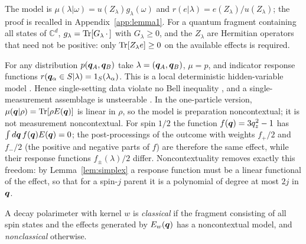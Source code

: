 The model is $\mu(\lambda|\omega)=u(Z_\lambda)g_\lambda(\omega)$ and $r(e|\lambda)=e(Z_\lambda)/u(Z_\lambda)$; the proof is recalled in Appendix~\ref{app:lemma1}. For a quantum fragment containing all states of $\mathbb{C}^d$, $g_\lambda=\operatorname{Tr}[G_\lambda\,\cdot\,]$ with $G_\lambda\ge0$, and the $Z_\lambda$ are Hermitian operators that need not be positive: only $\operatorname{Tr}[Z_\lambda e]\ge0$ on the available effects is required.

\begin{remark}
\label{rem:lhv}
For any distribution $p(\bm{q}_A,\bm{q}_B)$ take $\lambda=(\bm{q}_A,\bm{q}_B)$, $\mu=p$, and indicator response functions $r(\bm{q}_\alpha\in S|\lambda)=1_S(\lambda_\alpha)$. This is a local deterministic hidden-variable model \cite{abel1992,abel2025,fucci2026}. Hence single-setting data violate no Bell inequality \cite{brunner2014}, and a single-measurement assemblage is unsteerable \cite{wiseman2007}. In the one-particle version, $\mu(\bm{q}|\rho)=\operatorname{Tr}[\rho E(\bm{q})]$ is linear in $\rho$, so the model is preparation noncontextual; it is not measurement noncontextual. For spin $1/2$ the function $f(\bm{q})=3q_z^2-1$ has $\int d\bm{q}\,f(\bm{q})E(\bm{q})=0$; the post-processings of the outcome with weights $f_+/2$ and $f_-/2$ (the positive and negative parts of $f$) are therefore the same effect, while their response functions $f_\pm(\lambda)/2$ differ. Noncontextuality removes exactly this freedom: by Lemma~\ref{lem:simplex} a response function must be a linear functional of the effect, so that for a spin-$j$ parent it is a polynomial of degree at most $2j$ in $\bm{q}$.
\end{remark}

\begin{definition}
A decay polarimeter with kernel $w$ is \emph{classical} if the fragment consisting of all spin states and the effects generated by $E_w(\bm{q})$ has a noncontextual model, and \emph{nonclassical} otherwise.
\end{definition}
